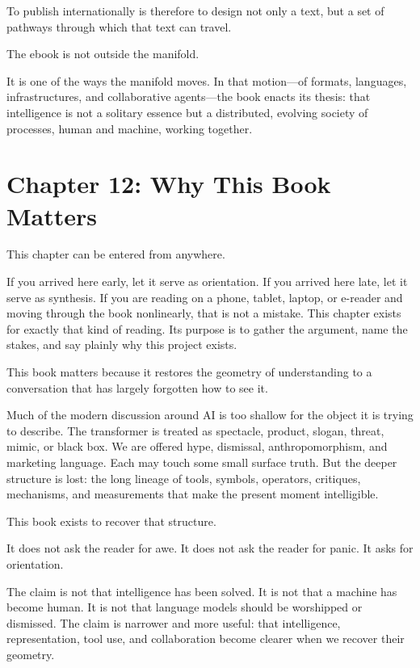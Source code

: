 To publish internationally is therefore to design not only a text, but a
set of pathways through which that text can travel.

The ebook is not outside the manifold.

It is one of the ways the manifold moves. In that motion---of formats,
languages, infrastructures, and collaborative agents---the book enacts
its thesis: that intelligence is not a solitary essence but a
distributed, evolving society of processes, human and machine, working
together.

\newpage
\vspace*{3cm}

\hypertarget{chapter-12-why-this-book-matters}{%
\section{Chapter 12: Why This Book
Matters}\label{chapter-12-why-this-book-matters}}

This chapter can be entered from anywhere.

If you arrived here early, let it serve as orientation. If you arrived
here late, let it serve as synthesis. If you are reading on a phone,
tablet, laptop, or e-reader and moving through the book nonlinearly,
that is not a mistake. This chapter exists for exactly that kind of
reading. Its purpose is to gather the argument, name the stakes, and say
plainly why this project exists.

This book matters because it restores the geometry of understanding to a
conversation that has largely forgotten how to see it.

Much of the modern discussion around AI is too shallow for the object it
is trying to describe. The transformer is treated as spectacle, product,
slogan, threat, mimic, or black box. We are offered hype, dismissal,
anthropomorphism, and marketing language. Each may touch some small
surface truth. But the deeper structure is lost: the long lineage of
tools, symbols, operators, critiques, mechanisms, and measurements that
make the present moment intelligible.

This book exists to recover that structure.

It does not ask the reader for awe. It does not ask the reader for
panic. It asks for orientation.

The claim is not that intelligence has been solved. It is not that a
machine has become human. It is not that language models should be
worshipped or dismissed. The claim is narrower and more useful: that
intelligence, representation, tool use, and collaboration become clearer
when we recover their geometry.

